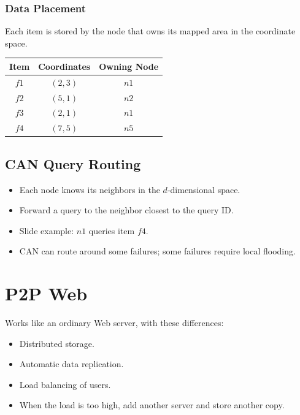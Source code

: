 \documentclass{article}
\begin{document}
\subsubsection{Data Placement}

Each item is stored by the node that owns its mapped area in the coordinate space.

\begin{center}
\begin{tabular}{ccc}
\toprule
Item & Coordinates & Owning Node \\
\midrule
\(f1\) & \((2,3)\) & \(n1\) \\
\(f2\) & \((5,1)\) & \(n2\) \\
\(f3\) & \((2,1)\) & \(n1\) \\
\(f4\) & \((7,5)\) & \(n5\) \\
\bottomrule
\end{tabular}
\end{center}

\subsection{CAN Query Routing}
\begin{itemize}
    \item Each node knows its neighbors in the \(d\)-dimensional space.
    \item Forward a query to the neighbor closest to the query ID.
    \item Slide example: \(n1\) queries item \(f4\).
    \item CAN can route around some failures; some failures require local flooding.
\end{itemize}

\section{P2P Web}

Works like an ordinary Web server, with these differences:
\begin{itemize}
    \item Distributed storage.
    \item Automatic data replication.
    \item Load balancing of users.
    \item When the load is too high, add another server and store another copy.
\end{itemize}
\end{document}
